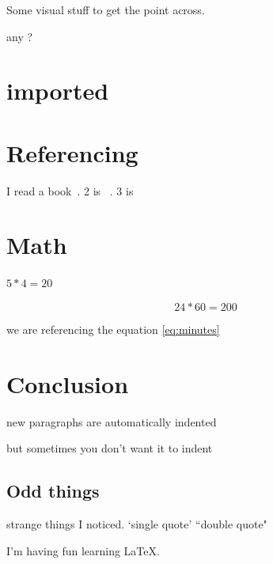 \documentclass{article}
\begin{document}
Some visual stuff to get the point across.

any ? 

\section{imported}


\section{Referencing}

I read a book~\cite{Bill2010}. 2 is ~\cite{latex}. 3 is ~\cite{Tom1980}

\section{Math}
$5*4=20$

\begin{equation}
	24 * 60 = 200
	\label{eq:minutes}
\end{equation}

we are referencing the equation \ref{eq:minutes}



\section{Conclusion}

new paragraphs are automatically indented

\noindent but sometimes you don't want it to indent

\subsection{Odd things}

strange things I noticed. `single quote' ``double quote"

I'm having fun learning \LaTeX.



\end{document}
